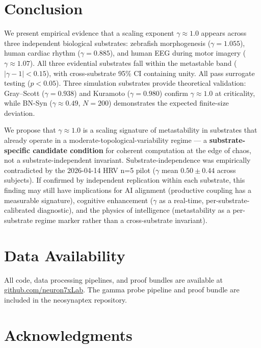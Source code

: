 \documentclass[11pt,a4paper,twocolumn]{article}
\begin{document}
\section{Conclusion}

We present empirical evidence that a scaling exponent $\gamma \approx 1.0$ appears across three independent biological substrates: zebrafish morphogenesis ($\gamma = 1.055$), human cardiac rhythm ($\gamma = 0.885$), and human EEG during motor imagery ($\gamma \approx 1.07$). All three evidential substrates fall within the metastable band ($|\gamma - 1| < 0.15$), with cross-substrate 95\% CI containing unity. All pass surrogate testing ($p < 0.05$). Three simulation substrates provide theoretical validation: Gray--Scott ($\gamma = 0.938$) and Kuramoto ($\gamma = 0.980$) confirm $\gamma \approx 1.0$ at criticality, while BN-Syn ($\gamma \approx 0.49$, $N\!=\!200$) demonstrates the expected finite-size deviation.

We propose that $\gamma \approx 1.0$ is a scaling signature of metastability in substrates that already operate in a moderate-topological-variability regime --- a \textbf{substrate-specific candidate condition} for coherent computation at the edge of chaos, not a substrate-independent invariant. Substrate-independence was empirically contradicted by the 2026-04-14 HRV n=5 pilot ($\gamma$ mean $0.50 \pm 0.44$ across subjects). If confirmed by independent replication within each substrate, this finding may still have implications for AI alignment (productive coupling has a measurable signature), cognitive enhancement ($\gamma$ as a real-time, per-substrate-calibrated diagnostic), and the physics of intelligence (metastability as a per-substrate regime marker rather than a cross-substrate invariant).

\section*{Data Availability}

All code, data processing pipelines, and proof bundles are available at \url{github.com/neuron7xLab}. The gamma probe pipeline and proof bundle are included in the neosynaptex repository.

\section*{Acknowledgments}
\end{document}
